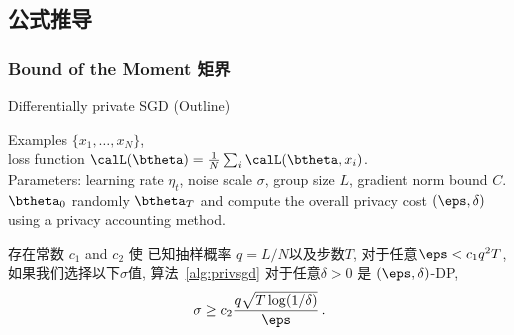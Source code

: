  
 


\subsection{公式推导}

\subsubsection{Bound of the Moment 矩界}

\begin{algorithm}[htb]
	\caption{Differentially private SGD (Outline)}\label{alg:privsgd}
	\begin{algorithmic}
	\REQUIRE Examples $\{x_1,\ldots,x_N\}$,\\ loss function $\calL(\btheta)=\frac{1}{N}\sum_i \calL(\btheta, x_i)$. \\ Parameters: learning rate $\eta_t$, noise scale $\sigma$, group size $L$, gradient norm bound $C$. 
		 $\btheta_0$ randomly
		\ENDFOR
		 $\btheta_T$ and compute the overall privacy cost $(\eps, \delta)$ using a privacy accounting method.
	\end{algorithmic}
\end{algorithm}

\begin{theorem}
      \label{thm:momentBound}
	存在常数 $c_1$ and $c_2$ 使 已知抽样概率  $q=L/N$以及步数$T$, 对于任意$\eps < c_1 q^2T$, 如果我们选择以下$\sigma$值, 算法~\ref{alg:privsgd} 对于任意$\delta>0$  是 $(\eps,\delta)$-DP,  
	\begin{align*}
	\sigma \geq c_2\frac{q \sqrt{T \log(1/\delta)}}{\eps}\,.
	\end{align*}
\end{theorem}

